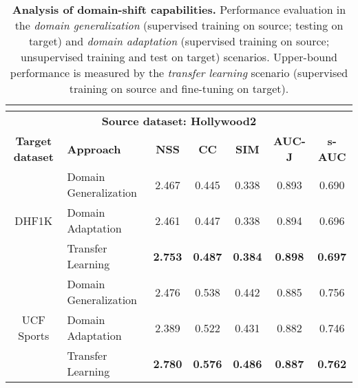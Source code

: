 \begin{table*}[ht!]
\begin{tabular}{c|lccccc}
            \midrule
            \multicolumn{7}{c}{} \\
            \toprule
            \multicolumn{7}{c}{\textbf{Source dataset: Hollywood2}}\\ 
            \midrule
            \textbf{Target dataset} &\textbf{Approach} & \textbf{NSS} & \textbf{CC} & \textbf{SIM} & \textbf{AUC-J} & \textbf{s-AUC} \\
            \midrule
            \multirow{3}{*}{DHF1K} &Domain Generalization  &  2.467 & 0.445 & 0.338 & 0.893 & 0.690 \\
            &Domain Adaptation  & 2.461 &  0.447    & 0.338 &  0.894 & 0.696 \\
            &Transfer Learning  & \textbf{2.753}    &  \textbf{0.487}    & \textbf{0.384}    & \textbf{0.898} & \textbf{0.697} \\
            \midrule
            \multirow{3}{*}{UCF Sports} &Domain Generalization  &  2.476 & 0.538 & 0.442 & 0.885 & 0.756 \\
            &Domain Adaptation  & 2.389 &  0.522   & 0.431 &  0.882 & 0.746 \\
            &Transfer Learning  & \textbf{2.780}    & \textbf{0.576}    & \textbf{0.486}    & \textbf{0.887} & \textbf{0.762} \\
            \bottomrule
        \end{tabular}
        \caption{\textbf{Analysis of domain-shift capabilities.} Performance evaluation in the \emph{domain generalization} (supervised training on source; testing on target) and \emph{domain adaptation} (supervised training on source; unsupervised training and test on target) scenarios. Upper-bound performance is measured by the \emph{transfer learning} scenario (supervised training on source and fine-tuning on target).} 
        \label{tab:unsupervisedDA}
    \end{table*}

